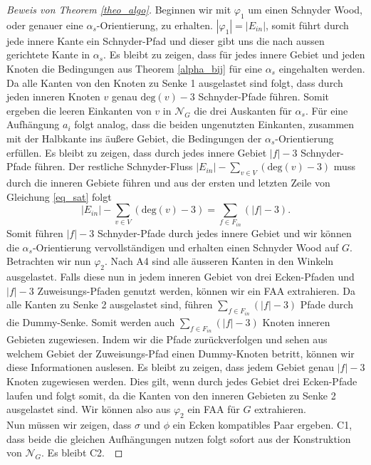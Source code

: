 \begin{proof}[Beweis von Theorem \ref{theo_algo}]
Beginnen wir mit $\varphi_1$ um einen Schnyder Wood, oder genauer eine $\alpha_s$-Orientierung, zu erhalten. $|\varphi_1| = |E_{in}|$, somit führt durch jede innere Kante ein Schnyder-Pfad und dieser gibt uns die nach aussen gerichtete Kante in $\alpha_s$. Es bleibt zu zeigen, dass für jedes innere Gebiet und jeden Knoten die Bedingungen aus Theorem \ref{alpha_bij} für eine $\alpha_s$ eingehalten werden. Da alle Kanten von den Knoten zu Senke 1 ausgelastet sind folgt, dass durch jeden inneren Knoten $v$ genau $\text{deg}(v)-3$ Schnyder-Pfade führen. Somit ergeben die leeren Einkanten von $v$ in $\mathcal{N}_G$ die drei Auskanten für $\alpha_s$. Für eine Aufhängung $a_i$ folgt analog, dass die beiden ungenutzten Einkanten, zusammen mit der Halbkante ins äußere Gebiet, die Bedingungen der $\alpha_s$-Orientierung erfüllen. Es bleibt zu zeigen, dass durch jedes innere Gebiet $|f|-3$ Schnyder-Pfade führen. Der restliche Schnyder-Fluss $|E_{in}| - \sum_{v \in V} (\text{deg}(v)-3)$ muss durch die inneren Gebiete führen und aus der ersten und letzten Zeile von Gleichung \ref{eq_sat} folgt $$|E_{in}| - \sum_{v \in V} (\text{deg}(v)-3) = \sum_{f \in F_{in}} (|f|-3).$$
Somit führen $|f|-3$ Schnyder-Pfade durch jedes innere Gebiet und wir können die $\alpha_s$-Orientierung vervollständigen und erhalten einen Schnyder Wood auf $G$.\\

Betrachten wir nun $\varphi_2$. Nach A4 sind alle äusseren Kanten in den Winkeln ausgelastet. Falls diese nun in jedem inneren Gebiet von drei Ecken-Pfaden und $|f|-3$ Zuweisungs-Pfaden genutzt werden, können wir ein FAA extrahieren. Da alle Kanten zu Senke 2 ausgelastet sind, führen $\sum_{f \in F_{in}} (|f|-3)$ Pfade durch die Dummy-Senke. Somit werden auch $\sum_{f \in F_{in}} (|f|-3)$ Knoten inneren Gebieten zugewiesen. Indem wir die Pfade zurückverfolgen und sehen aus welchem Gebiet der Zuweisungs-Pfad einen Dummy-Knoten betritt, können wir diese Informationen auslesen. Es bleibt zu zeigen, dass jedem Gebiet genau $|f|-3$ Knoten zugewiesen werden. Dies gilt, wenn durch jedes Gebiet drei Ecken-Pfade laufen und folgt somit, da die Kanten von den inneren Gebieten zu Senke 2 ausgelastet sind. Wir können also aus $\varphi_2$ ein FAA für $G$ extrahieren. \\

Nun müssen wir zeigen, dass $\sigma$ und $\phi$ ein Ecken kompatibles Paar ergeben. C1, dass beide die gleichen Aufhängungen nutzen folgt sofort aus der Konstruktion von $\mathcal{N}_G$. Es bleibt C2.\


\end{proof}
